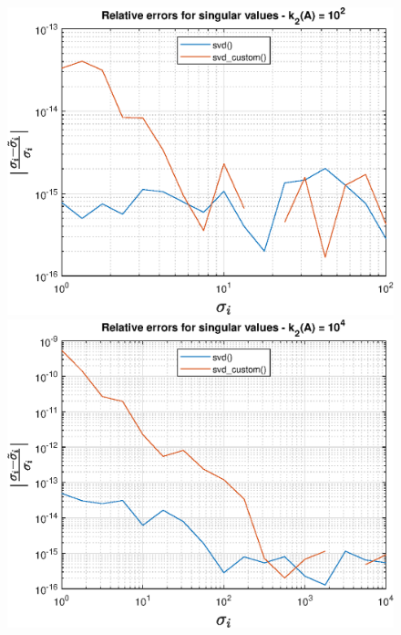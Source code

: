 \begin{figure}[!htb]
\includegraphics[width=\textwidth]{imgs/10_-_Relative_errors_for_singular_values_-_k_2(A)_=_10^2.eps}
\endminipage\hfill
{}  
\includegraphics[width=\textwidth]{imgs/11_-_Relative_errors_for_singular_values_-_k_2(A)_=_10^4.eps}
\endminipage
\end{figure}


